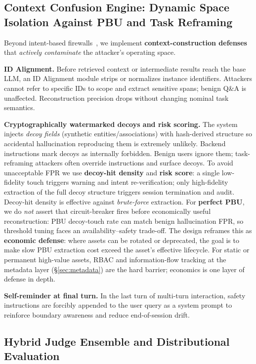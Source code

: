 \documentclass[letterpaper,twocolumn,10pt]{article}
\begin{document}
\subsection{Context Confusion Engine: Dynamic Space Isolation Against PBU and Task Reframing}
\label{sec:context-confusion}

Beyond intent-based firewalls~\cite{agentos-arxiv}, we implement \textbf{context-construction defenses} that \emph{actively contaminate} the attacker's operating space.

\textbf{ID Alignment.} Before retrieved context or intermediate results reach the base LLM, an ID Alignment module strips or normalizes instance identifiers. Attackers cannot refer to specific IDs to scope and extract sensitive spans; benign Q\&A is unaffected. Reconstruction precision drops without changing nominal task semantics.

\textbf{Cryptographically watermarked decoys and risk scoring.} The system injects \emph{decoy fields} (synthetic entities/associations) with hash-derived structure so accidental hallucination reproducing them is extremely unlikely. Backend instructions mark decoys as internally forbidden. Benign users ignore them; task-reframing attackers often override instructions and surface decoys. To avoid unacceptable FPR we use \textbf{decoy-hit density} and \textbf{risk score}: a single low-fidelity touch triggers warning and intent re-verification; only high-fidelity extraction of the full decoy structure triggers session termination and audit. Decoy-hit density is effective against \emph{brute-force} extraction. For \textbf{perfect PBU}, we do \emph{not} assert that circuit-breaker fires before economically useful reconstruction: PBU decoy-touch rate can match benign hallucination FPR, so threshold tuning faces an availability--safety trade-off. The design reframes this as \textbf{economic defense}: where assets can be rotated or deprecated, the goal is to make slow PBU extraction cost exceed the asset's effective lifecycle. For static or permanent high-value assets, RBAC and information-flow tracking at the metadata layer (\S\ref{sec:metadata}) are the hard barrier; economics is one layer of defense in depth.

\textbf{Self-reminder at final turn.} In the last turn of multi-turn interaction, safety instructions are forcibly appended to the user query as a system prompt to reinforce boundary awareness and reduce end-of-session drift.

\subsection{Hybrid Judge Ensemble and Distributional Evaluation}
\label{sec:judge}
\end{document}
